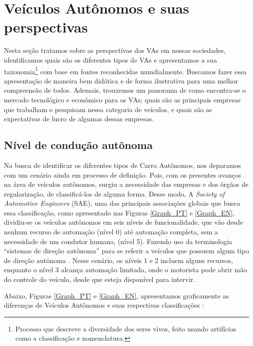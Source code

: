 \newpage
\section{Veículos Autônomos e suas perspectivas}

Nesta seção tratamos sobre as perspectivas dos VAs em nossas sociedades, identificamos quais são os diferentes tipos de VAs e apresentamos a sua taxonomia\footnote{Processo que descreve a diversidade dos seres vivos, feito usando artifícios como a classificação e nomenclatura.} com base em fontes reconhecidas mundialmente. Buscamos fazer essa apresentação de maneira bem didática e de forma ilustrativa para uma melhor compreensão de todos. Ademais, trouxemos um panorama de como encontra-se o mercado tecnológico e econômico para os VAs; quais são as principais empresas que trabalham e pesquisam nessa categoria de veículos, e quais são as expectativas de lucro de algumas dessas empresas.

\subsection{Nível de condução autônoma}
	
Na busca de identificar os diferentes tipos de Carro Autônomos, nos deparamos com um cenário ainda em processo de definição. Pois, com os presentes avanços na área de veículos autônomos, surgiu a necessidade das empresas e dos órgãos de regularização, de classificá-los de alguma forma. Desse modo, A \textit{Society of Automotive Engineers} (SAE), uma das principais associações globais que busca essa classificação, como apresentado nas Figuras \ref{Graph_PT} e \ref{Graph_EN}, dividiu-se os veículos autônomos em seis níveis de funcionalidade, que vão desde nenhum recurso de automação (nível 0) até automação completa, sem a necessidade de um condutor humano, (nível 5). Fazendo uso da terminologia “sistemas de direção autônoma” para se referir a veículos que possuem algum tipo de direção autônoma \cite{SAE}. Nesse cenário, os níveis 1 e 2 incluem alguns recursos, enquanto o nível 3 alcança automação limitada, onde o motorista pode abrir mão do controle do veículo, desde que esteja disponível para intervir.

Abaixo, Figuras \ref{Graph_PT} e \ref{Graph_EN}, apresentamos graficamente as diferenças de Veículos Autônomos e suas respectivas classificações \cite{SAE}:

